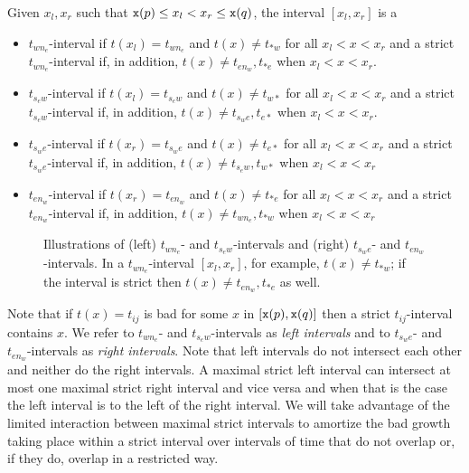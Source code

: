 \begin{definition}
Given $x_l, x_r$ such that ${\tt x}(p) \leq x_l < x_r \leq {\tt x}(q)$, the interval
$[x_l,x_r]$ is a 
\begin{itemize}
\item $t_{wn_e}$-interval if $t(x_l)= t_{wn_e}$ and $t(x) \not= t_{\ast w}$ for all
$x_l < x < x_r$ and a strict $t_{wn_e}$-interval if, in addition,
$t(x) \not= t_{en_w}, t_{\ast e}$ when $x_l < x < x_r$.
\item $t_{s_ew}$-interval if $t(x_l)= t_{s_ew}$ and $t(x) \not= t_{w \ast}$ for all
$x_l < x < x_r$ and a strict $t_{s_ew}$-interval if, in addition,
$t(x) \not= t_{s_we}, t_{e \ast}$ when $x_l < x < x_r$.
\item $t_{s_we}$-interval if $t(x_r)= t_{s_we}$ and $t(x) \not= t_{e \ast}$ for all
$x_l < x < x_r$ and a strict $t_{s_we}$-interval if, in addition,
$t(x) \not= t_{s_ew}, t_{w \ast}$ when $x_l < x < x_r$
\item $t_{en_w}$-interval if $t(x_r)= t_{en_w}$ and $t(x) \not= t_{\ast e}$ for all
$x_l < x < x_r$ and a strict $t_{en_w}$-interval if, in addition,
$t(x) \not= t_{wn_e}, t_{\ast w}$ when $x_l < x < x_r$
\end{itemize}
\end{definition}

\begin{figure}[!b]
\begin{center}
\badintervals
\end{center}

\caption{Illustrations of (left) $t_{wn_e}$- and $t_{s_ew}$-intervals and (right)
$t_{s_we}$- and $t_{en_w}$-intervals. In a $t_{wn_e}$-interval $[x_l,x_r]$, for
example, $t(x) \not= t_{\ast w}$; if the interval is strict then 
$t(x) \not= t_{en_w}, t_{\ast e}$ as well.}
\label{fig:badintervals}
\end{figure}



Note that if $t(x) = t_{ij}$ is bad for some $x$ in $[{\tt x}(p), {\tt x}(q)]$
then a strict $t_{ij}$-interval contains $x$.
We refer to $t_{wn_e}$- and $t_{s_ew}$-intervals as {\em left intervals} and to
$t_{s_we}$- and $t_{en_w}$-intervals as {\em right intervals}. Note that left
intervals do not intersect each other and neither do the right intervals.
A maximal strict left interval can intersect at most one maximal strict right
interval and vice versa and when that is the case the left interval is to the
left of the right interval.
We will take advantage of the limited interaction between maximal
strict intervals 
to amortize the bad growth taking place within a strict interval over
intervals of time
that do not overlap or, if they do, overlap in a restricted way.



